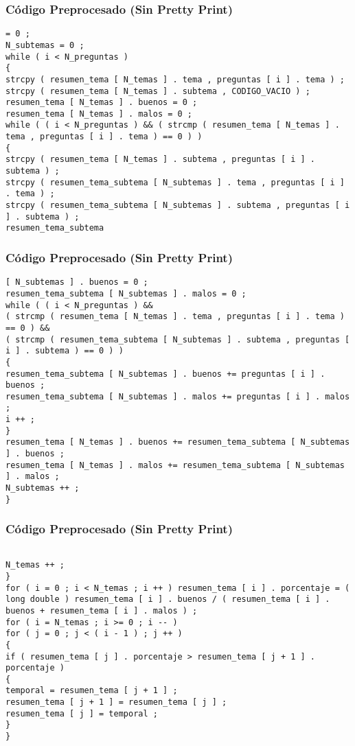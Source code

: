 \documentclass{beamer}
\begin{document}
\begin{frame}[fragile]
\frametitle{C\'odigo Preprocesado (Sin Pretty Print)}
\begin{lstlisting}[style=CStyle]
= 0 ; 
N_subtemas = 0 ; 
while ( i < N_preguntas ) 
{ 
strcpy ( resumen_tema [ N_temas ] . tema , preguntas [ i ] . tema ) ; 
strcpy ( resumen_tema [ N_temas ] . subtema , CODIGO_VACIO ) ; 
resumen_tema [ N_temas ] . buenos = 0 ; 
resumen_tema [ N_temas ] . malos = 0 ; 
while ( ( i < N_preguntas ) && ( strcmp ( resumen_tema [ N_temas ] . tema , preguntas [ i ] . tema ) == 0 ) ) 
{ 
strcpy ( resumen_tema [ N_temas ] . subtema , preguntas [ i ] . subtema ) ; 
strcpy ( resumen_tema_subtema [ N_subtemas ] . tema , preguntas [ i ] . tema ) ; 
strcpy ( resumen_tema_subtema [ N_subtemas ] . subtema , preguntas [ i ] . subtema ) ; 
resumen_tema_subtema \end{lstlisting}
\end{frame}
\begin{frame}[fragile]
\frametitle{C\'odigo Preprocesado (Sin Pretty Print)}
\begin{lstlisting}[style=CStyle]
[ N_subtemas ] . buenos = 0 ; 
resumen_tema_subtema [ N_subtemas ] . malos = 0 ; 
while ( ( i < N_preguntas ) && 
( strcmp ( resumen_tema [ N_temas ] . tema , preguntas [ i ] . tema ) == 0 ) && 
( strcmp ( resumen_tema_subtema [ N_subtemas ] . subtema , preguntas [ i ] . subtema ) == 0 ) ) 
{ 
resumen_tema_subtema [ N_subtemas ] . buenos += preguntas [ i ] . buenos ; 
resumen_tema_subtema [ N_subtemas ] . malos += preguntas [ i ] . malos ; 
i ++ ; 
} 
resumen_tema [ N_temas ] . buenos += resumen_tema_subtema [ N_subtemas ] . buenos ; 
resumen_tema [ N_temas ] . malos += resumen_tema_subtema [ N_subtemas ] . malos ; 
N_subtemas ++ ; 
} \end{lstlisting}
\end{frame}
\begin{frame}[fragile]
\frametitle{C\'odigo Preprocesado (Sin Pretty Print)}
\begin{lstlisting}[style=CStyle]

N_temas ++ ; 
} 
for ( i = 0 ; i < N_temas ; i ++ ) resumen_tema [ i ] . porcentaje = ( long double ) resumen_tema [ i ] . buenos / ( resumen_tema [ i ] . buenos + resumen_tema [ i ] . malos ) ; 
for ( i = N_temas ; i >= 0 ; i -- ) 
for ( j = 0 ; j < ( i - 1 ) ; j ++ ) 
{ 
if ( resumen_tema [ j ] . porcentaje > resumen_tema [ j + 1 ] . porcentaje ) 
{ 
temporal = resumen_tema [ j + 1 ] ; 
resumen_tema [ j + 1 ] = resumen_tema [ j ] ; 
resumen_tema [ j ] = temporal ; 
} 
} \end{lstlisting}
\end{frame}
\end{document}
